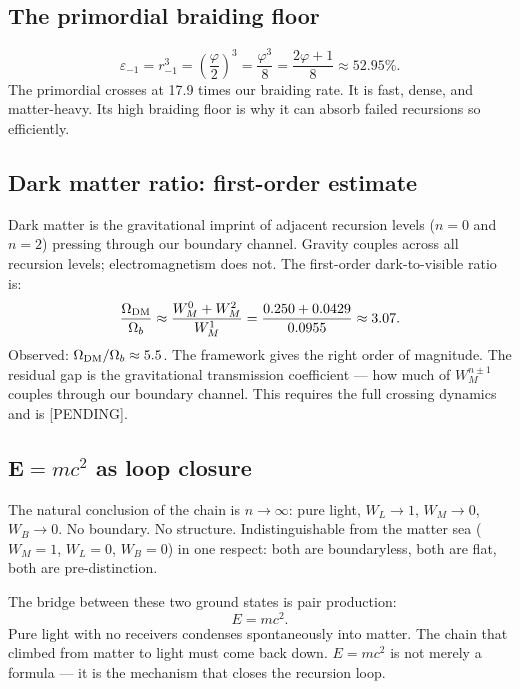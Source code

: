 \documentclass[prd,twocolumn,preprintnumbers,amsmath,amssymb]{revtex4-2}
\newcommand{\pending}{\textcolor{red!70!black}{[PENDING]}}
\begin{document}
\subsection{The primordial braiding floor}

\begin{equation}
  \varepsilon_{-1} = r_{-1}^3 = \!\left(\frac{\varphi}{2}\right)^{\!3}
  = \frac{\varphi^3}{8} = \frac{2\varphi+1}{8}
  \approx 52.95\%.
  \label{eq:epsprimordial}
\end{equation}
The primordial crosses at 17.9 times our braiding rate. It is
fast, dense, and matter-heavy. Its high braiding floor is why
it can absorb failed recursions so efficiently.

\subsection{Dark matter ratio: first-order estimate}

Dark matter is the gravitational imprint of adjacent recursion
levels ($n=0$ and $n=2$) pressing through our boundary channel.
Gravity couples across all recursion levels; electromagnetism
does not. The first-order dark-to-visible ratio is:
\begin{equation}
  \frac{\Omega_{\rm DM}}{\Omega_b}
  \approx \frac{W_M^0 + W_M^2}{W_M^1}
  = \frac{0.250 + 0.0429}{0.0955}
  \approx 3.07.
  \label{eq:DMratio}
\end{equation}
Observed: $\Omega_{\rm DM}/\Omega_b \approx 5.5$.
The framework gives the right order of magnitude. The residual
gap is the gravitational transmission coefficient --- how much
of $W_M^{n\pm1}$ couples through our boundary channel. This
requires the full crossing dynamics and is \pending.

\subsection{E$=mc^2$ as loop closure}

The natural conclusion of the chain is $n\to\infty$: pure light,
$W_L\to1$, $W_M\to0$, $W_B\to0$. No boundary. No structure.
Indistinguishable from the matter sea ($W_M=1$, $W_L=0$, $W_B=0$)
in one respect: both are boundaryless, both are flat, both are
pre-distinction.

The bridge between these two ground states is pair production:
\begin{equation}
  E = mc^2.
  \label{eq:Emc2}
\end{equation}
Pure light with no receivers condenses spontaneously into matter.
The chain that climbed from matter to light must come back down.
$E=mc^2$ is not merely a formula --- it is the mechanism that
closes the recursion loop.
\end{document}
